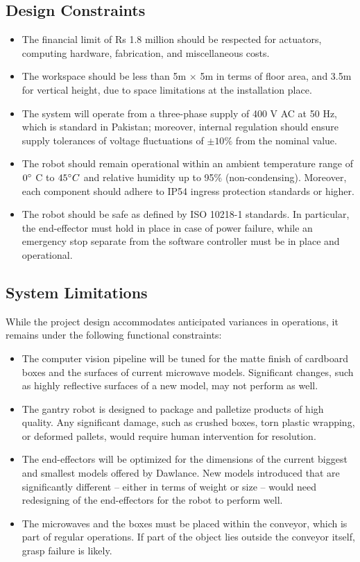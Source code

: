 \subsection{Design Constraints}
\begin{itemize}
    \item The financial limit of Rs 1.8 million should be respected for actuators, computing hardware, fabrication, and miscellaneous costs.
    \item The workspace should be less than 5m $\times$ 5m in terms of floor area, and 3.5m for vertical height, due to space limitations at the installation place.
    \item The system will operate from a three-phase supply of 400 V AC at 50 Hz, which is standard in Pakistan; moreover, internal regulation should ensure supply tolerances of voltage fluctuations of $\pm10\%$ from the nominal value.
    \item The robot should remain operational within an ambient temperature range of $0\degree$ C to $45\degree C$ and relative humidity up to 95\% (non-condensing). Moreover, each component should adhere to IP54 ingress protection standards or higher.
    \item The robot should be safe as defined by ISO 10218-1 standards. In particular, the end-effector must hold in place in case of power failure, while an emergency stop separate from the software controller must be in place and operational.
\end{itemize}

\subsection{System Limitations}
While the project design accommodates anticipated variances in operations, it remains under the following functional constraints:
\begin{itemize}
    \item The computer vision pipeline will be tuned for the matte finish of cardboard boxes and the surfaces of current microwave models. Significant changes, such as highly reflective surfaces of a new model, may not perform as well.
    \item The gantry robot is designed to package and palletize products of high quality. Any significant damage, such as crushed boxes, torn plastic wrapping, or deformed pallets, would require human intervention for resolution.
    \item The end-effectors will be optimized for the dimensions of the current biggest and smallest models offered by Dawlance. New models introduced that are significantly different -- either in terms of weight or size -- would need redesigning of the end-effectors for the robot to perform well.
    \item The microwaves and the boxes must be placed within the conveyor, which is part of regular operations. If part of the object lies outside the conveyor itself, grasp failure is likely.
\end{itemize}

